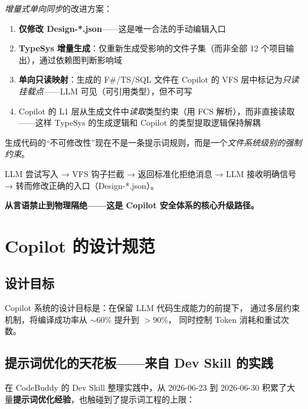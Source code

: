 \documentclass[10pt, openany]{book}
\begin{document}
\emph{增量式单向同步}的改进方案：
\begin{enumerate}
    \item \textbf{仅修改 Design-*.json}——这是唯一合法的手动编辑入口
    \item \textbf{TypeSys 增量生成}：仅重新生成受影响的文件子集（而非全部 12 个项目输出），通过依赖图判断影响域
    \item \textbf{单向只读映射}：生成的 F\#/TS/SQL 文件在 Copilot 的 VFS 层中标记为\emph{只读挂载点}——LLM 可见（可引用类型），但不可写
    \item Copilot 的 L1 层从生成文件中\emph{读取}类型约束（用 FCS 解析），而非直接读取 
        ——这样 TypeSys 的生成逻辑和 Copilot 的类型提取逻辑保持解耦
\end{enumerate}

\begin{principle}[生成代码的不可写性]
    生成代码的``不可修改性''现在不是一条提示词规则，而是一个\emph{文件系统级别的强制约束}。
    
    LLM 尝试写入  → VFS 钩子拦截 → 返回标准化拒绝消息 →
    LLM 接收明确信号 → 转而修改正确的入口（Design-*.json）。
    
    \textbf{从言语禁止到物理隔绝——这是 Copilot 安全体系的核心升级路径。}
\end{principle}

\chapter{Copilot 的设计规范}

\section{设计目标}

Copilot 系统的设计目标是：在保留 LLM 代码生成能力的前提下，
通过多层约束机制，将编译成功率从 \(\sim 60\%\) 提升到 \(>90\%\)，
同时控制 Token 消耗和重试次数。

\section{提示词优化的天花板——来自 Dev Skill 的实践}

在 CodeBuddy 的 Dev Skill 整理实践中，从 2026-06-23 到 2026-06-30
积累了大量\textbf{提示词优化经验}，也触碰到了提示词工程的上限：
\end{document}
